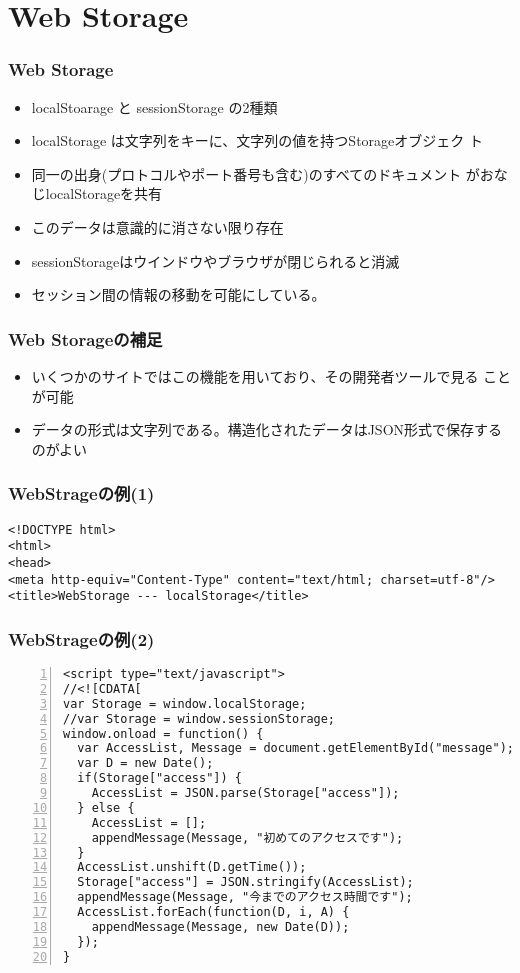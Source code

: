  \section{Web Storage}
\begin{frame}[containsverbatim]
 \frametitle{Web Storage}
 \begin{itemize}
 \item localStoarage と sessionStorage の2種類
 \item localStorage は文字列をキーに、文字列の値を持つStorageオブジェク
 ト
 \item 同一の出身(プロトコルやポート番号も含む)のすべてのドキュメント
 がおなじlocalStorageを共有
 \item このデータは意識的に消さない限り存在
 \item sessionStorageはウインドウやブラウザが閉じられると消滅
 \item セッション間の情報の移動を可能にしている。
 \end{itemize}
 \end{frame}
 \begin{frame}[containsverbatim]
 \frametitle{Web Storageの補足}
 \begin{itemize}
 \item いくつかのサイトではこの機能を用いており、その開発者ツールで見る
       ことが可能
 \item データの形式は文字列である。構造化されたデータはJSON形式で保存するのがよい
 \end{itemize}
 \end{frame}
\begin{frame}[containsverbatim]
 \frametitle{WebStrageの例(1)}
 \begin{Verbatim}[fontsize=\small]
<!DOCTYPE html>
<html>
<head>
<meta http-equiv="Content-Type" content="text/html; charset=utf-8"/>
<title>WebStorage --- localStorage</title>
\end{Verbatim}
 \end{frame}
\begin{frame}[containsverbatim]
 \frametitle{WebStrageの例(2)}
  \begin{Verbatim}[numbers=left, fontsize=\scriptsize]
<script type="text/javascript">
//<![CDATA[
var Storage = window.localStorage;
//var Storage = window.sessionStorage;
window.onload = function() {
  var AccessList, Message = document.getElementById("message");
  var D = new Date();
  if(Storage["access"]) {
    AccessList = JSON.parse(Storage["access"]);
  } else {
    AccessList = [];
    appendMessage(Message, "初めてのアクセスです");
  }
  AccessList.unshift(D.getTime());
  Storage["access"] = JSON.stringify(AccessList);
  appendMessage(Message, "今までのアクセス時間です");
  AccessList.forEach(function(D, i, A) {
    appendMessage(Message, new Date(D));
  });
}
\end{Verbatim}
 \end{frame}
